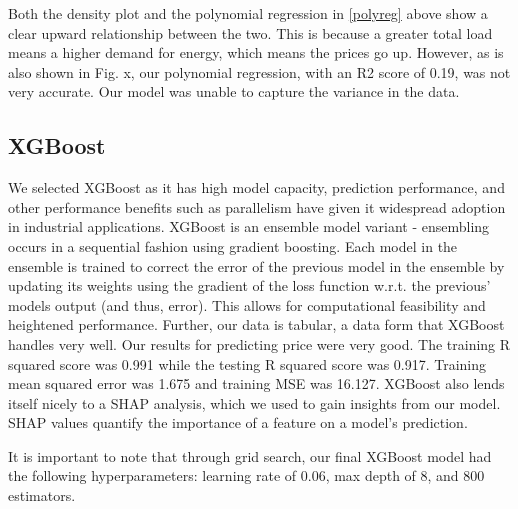 \documentclass[10pt]{article}
\begin{document}
Both the density plot and the polynomial regression in \ref{polyreg} above show a clear upward relationship between the two. This is because a greater total load means a higher demand for energy, which means the prices go up. However, as is also shown in Fig. x, our polynomial regression, with an R2 score of 0.19, was not very accurate. Our model was unable to capture the variance in the data.  

\subsection{XGBoost}

We selected XGBoost as it has high model capacity, prediction performance, and other performance benefits such as parallelism have given it widespread adoption in industrial applications. XGBoost is an ensemble model variant - ensembling occurs in a sequential fashion using gradient boosting. Each model in the ensemble is trained to correct the error of the previous model in the ensemble by updating its weights using the gradient of the loss function w.r.t. the previous’ models output (and thus, error). This allows for computational feasibility and heightened performance. Further, our data is tabular, a data form that XGBoost handles very well. Our results for predicting price were very good. The training R squared score was 0.991 while the testing R squared score was 0.917. Training mean squared error was 1.675 and training MSE was 16.127. XGBoost also lends itself nicely to a SHAP analysis, which we used to gain insights from our model.  SHAP values quantify the importance of a feature on a model’s prediction.

It is important to note that through grid search, our final XGBoost model had the following hyperparameters: learning rate of 0.06, max depth of 8, and 800 estimators.
\end{document}

